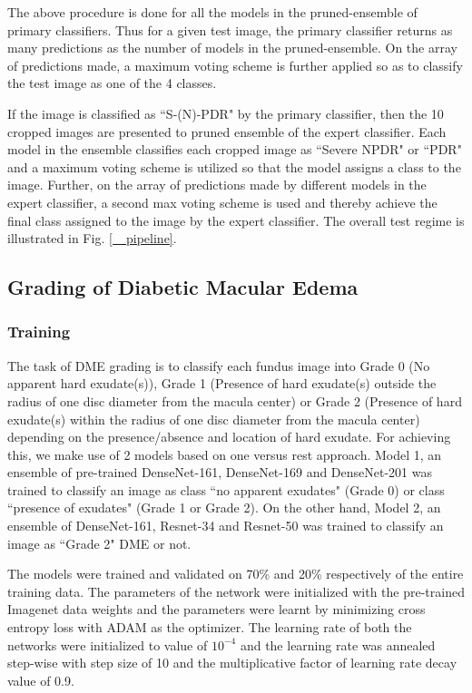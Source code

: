 \documentclass{paper}
\begin{document}
\par The above procedure is done for all the models in the pruned-ensemble of primary classifiers. Thus for a given test image, the primary classifier returns as many predictions as the number of models in the pruned-ensemble. On the array of predictions made, a maximum voting scheme is further applied so as to classify the test image as one of the 4 classes. 

\par If the image is classified as ``S-(N)-PDR"  by the primary classifier, then the 10 cropped images are presented to pruned ensemble of the expert classifier. Each model in the ensemble classifies each cropped image as ``Severe NPDR" or ``PDR" and a maximum voting scheme is utilized  so that the model assigns a class to the image. Further, on the array of predictions made by different models in the expert classifier, a second max voting scheme is used and thereby achieve the final class assigned to the image by the expert classifier. The overall test regime is illustrated in Fig. \ref{ _pipeline}.

\subsection{Grading of Diabetic Macular Edema}
\subsubsection*{Training}
The task of DME grading is to classify each fundus image into Grade 0 (No apparent hard exudate(s)), Grade 1 (Presence of hard exudate(s) outside the radius of one disc diameter from the macula center) or Grade 2 (Presence of hard exudate(s) within the radius of one disc diameter from the macula center) depending on the presence/absence and location of hard exudate. For achieving this, we make use of 2 models based on one versus rest approach. Model 1, an ensemble of pre-trained DenseNet-161, DenseNet-169 and DenseNet-201 was trained to classify an image as class ``no apparent exudates" (Grade 0) or class ``presence of exudates" (Grade 1 or Grade 2). On the other hand, Model 2, an ensemble of DenseNet-161, Resnet-34 and Resnet-50 was trained to classify an image as ``Grade 2" DME or not. 
\par The models were trained and validated on 70\% and 20\% respectively of the entire training data. The parameters of the network were initialized with the pre-trained Imagenet data weights and the parameters were learnt by minimizing cross entropy loss with ADAM as the optimizer. The learning rate of both the networks were initialized to value of $10^{-4}$ and the learning rate was annealed step-wise with step size of 10 and the multiplicative factor of learning rate decay value of 0.9.
\end{document}
